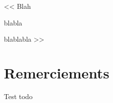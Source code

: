 \MakeUGthesePDG

\begin{savequote}[7cm]
<< Blah

\quad blabla

\quad blablabla >>
\end{savequote}
\chapter*{Remerciements}

\begin{todo}
Test todo
\end{todo}


\cleardoublepage
\dominitoc
\makeatletter
\renewcommand{\tableofcontents}[1][\contentsname]{%
  \chapter*{#1}
}
\makeatother
\tableofcontents
